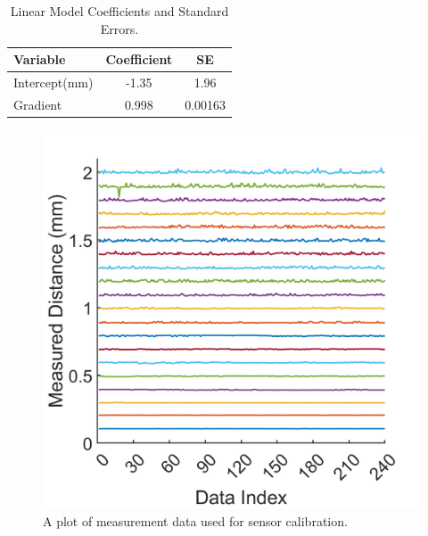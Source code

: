 \documentclass[a4paper,12pt]{article}
\begin{document}
\begin{table}[ht]
    \centering
    \begin{tabular}{lcc}
        \hline
        \textbf{Variable} & \textbf{Coefficient} & \textbf{SE} \\
        \hline
        Intercept(mm) & -1.35 & 1.96 \\
        Gradient & 0.998 & 0.00163 \\
        \hline
    \end{tabular}
    \caption{Linear Model Coefficients and Standard Errors.}
    \label{tab:linearModel}
\end{table}

\begin{figure}[htbp]
    \centering
    \begin{minipage}{0.45\textwidth}
        \centering
        \includegraphics[width=\linewidth]{figs/allCallibration.png}
        \caption{A plot of measurement data used for sensor calibration.}
        \label{fig:allcalibration}
    \end{minipage}\hfill
    \begin{minipage}{0.45\textwidth}
        \centering

\end{minipage}
\end{figure}
\end{document}
